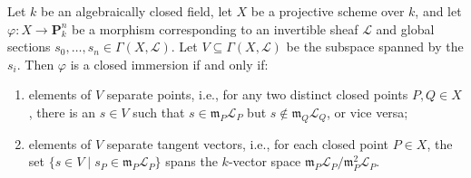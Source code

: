 Let $k$ be an algebraically closed field, let $X$ be a projective scheme over $k$, and let $\varphi: X \rightarrow \mathbf{P}_k^n$ be a morphism corresponding to an invertible sheaf $\mathcal{L}$ and global sections $s_0, \ldots, s_n \in \Gamma(X, \mathcal{L})$. Let $V \subseteq \Gamma(X, \mathcal{L})$ be the subspace spanned by the $s_i$. Then $\varphi$ is a closed immersion if and only if:
\begin{enumerate}
\item[(1)] elements of $V$ separate points, i.e., for any two distinct closed points $P, Q \in X$, there is an $s \in V$ such that $s \in \mathfrak{m}_P \mathcal{L}_P$ but $s \notin \mathfrak{m}_Q \mathcal{L}_Q$, or vice versa;
\item[(2)] elements of $V$ separate tangent vectors, i.e., for each closed point $P \in X$, the set $\{s \in V \mid s_P \in \mathfrak{m}_P \mathcal{L}_P\}$ spans the $k$-vector space $\mathfrak{m}_P \mathcal{L}_P / \mathfrak{m}_P^2 \mathcal{L}_P$.
\end{enumerate}
